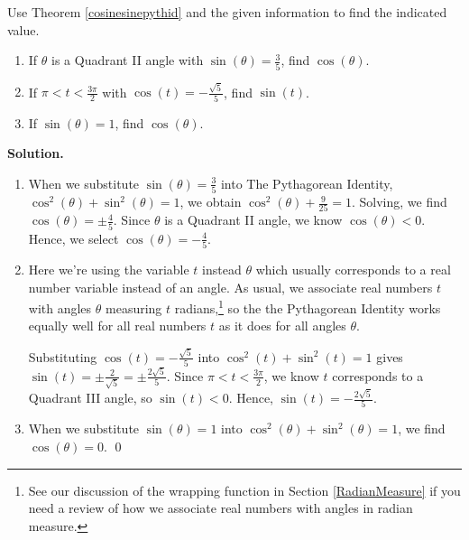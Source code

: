 \documentclass{ximera}
\begin{document}
\smallskip

\begin{example} \label{cosinesinepythidex} Use Theorem \ref{cosinesinepythid} and the given information  to find the indicated value.
\begin{enumerate}

\item If $\theta$ is a Quadrant II angle with  $\sin(\theta) = \frac{3}{5}$, find $\cos(\theta)$.

\item If $\pi < t < \frac{3\pi}{2}$ with  $\cos(t) = -\frac{\sqrt{5}}{5}$, find $\sin(t)$.

\item  If $\sin(\theta) = 1$, find $\cos(\theta)$.

\end{enumerate}



{\bf Solution.}  \begin{enumerate} \item  When we substitute $\sin(\theta) = \frac{3}{5}$ into The Pythagorean Identity, $\cos^{2}(\theta) + \sin^{2}(\theta) = 1$, we obtain $\cos^{2}(\theta) + \frac{9}{25} = 1$.  Solving, we find $\cos(\theta) = \pm \frac{4}{5}$.  Since $\theta$ is a Quadrant II angle, we know $\cos(\theta)<0$.  Hence, we select  $\cos(\theta) = - \frac{4}{5}$.

\item Here we're using the variable $t$ instead $\theta$ which usually corresponds to a real number variable instead of an angle.  As usual,  we associate real numbers $t$ with angles $\theta$ measuring $t$ radians,\footnote{See our discussion of the wrapping function in Section \ref{RadianMeasure} if you need a review of how we associate real numbers with angles in radian measure.} so the the Pythagorean Identity works equally well for all real numbers $t$ as it does for all angles $\theta$.

\smallskip

 Substituting $\cos(t) = -\frac{\sqrt{5}}{5}$ into $\cos^{2}(t) + \sin^{2}(t) = 1$ gives $\sin(t) = \pm \frac{2}{\sqrt{5}} = \pm \frac{2 \sqrt{5}}{5}$.  Since  $\pi < t < \frac{3\pi}{2}$, we know $t$ corresponds to a Quadrant III angle, so $\sin(t) <0$.   Hence,  $\sin(t) = -\frac{2 \sqrt{5}}{5}$.

\item  When we substitute $\sin(\theta) = 1$ into $\cos^{2}(\theta) + \sin^{2}(\theta) = 1$, we find $\cos(\theta) = 0$. \qed 

\end{enumerate}

\end{example}
\end{document}
